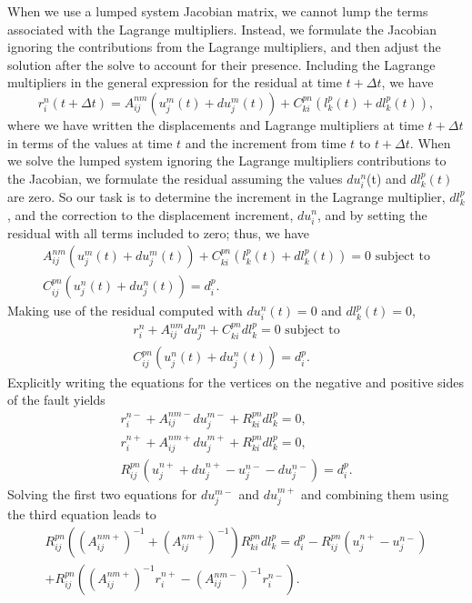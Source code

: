 When we use a lumped system Jacobian matrix, we cannot lump the terms
associated with the Lagrange multipliers. Instead, we formulate the
Jacobian ignoring the contributions from the Lagrange multipliers,
and then adjust the solution after the solve to account for their
presence. Including the Lagrange multipliers in the general expression
for the residual at time $t+\Delta t$, we have
\begin{equation}
r_{i}^{n}(t+\Delta t)=A_{ij}^{nm}(u_{j}^{m}(t)+du_{j}^{m}(t))+C_{ki}^{pn}(l_{k}^{p}(t)+dl_{k}^{p}(t)),
\end{equation}
where we have written the displacements and Lagrange multipliers at
time $t+\Delta t$ in terms of the values at time $t$ and the increment
from time $t$ to $t+\Delta t$. When we solve the lumped system ignoring
the Lagrange multipliers contributions to the Jacobian, we formulate
the residual assuming the values $du_{i}^{n}$(t) and $dl_{k}^{p}(t)$
are zero. So our task is to determine the increment in the Lagrange
multiplier, $dl_{k}^{p}$, and the correction to the displacement
increment, $du_{i}^{n}$, and by setting the residual with all terms
included to zero; thus, we have
\begin{gather}
A_{ij}^{nm}(u_{j}^{m}(t)+du_{j}^{m}(t))+C_{ki}^{pn}(l_{k}^{p}(t)+dl_{k}^{p}(t))=0\text{ subject to}\\
C_{ij}^{pn}(u_{j}^{n}(t)+du_{j}^{n}(t))=d_{i}^{p}.
\end{gather}
Making use of the residual computed with $du_{i}^{n}(t)=0$ and $dl_{k}^{p}(t)=0$,
\begin{gather}
r_{i}^{n}+A_{ij}^{nm}du_{j}^{m}+C_{ki}^{pn}dl_{k}^{p}=0\text{ subject to}\\
C_{ij}^{pn}(u_{j}^{n}(t)+du_{j}^{n}(t))=d_{i}^{p}.
\end{gather}
Explicitly writing the equations for the vertices on the negative
and positive sides of the fault yields
\begin{gather}
r_{i}^{n-}+A_{ij}^{nm-}du_{j}^{m-}+R_{ki}^{pn}dl_{k}^{p}=0,\\
r_{i}^{n+}+A_{ij}^{nm+}du_{j}^{m+}+R_{ki}^{pn}dl_{k}^{p}=0,\\
R_{ij}^{pn}(u_{j}^{n+}+du_{j}^{n+}-u_{j}^{n-}-du_{j}^{n-})=d_{i}^{p}.
\end{gather}
Solving the first two equations for $du_{j}^{m-}$ and $du_{j}^{m+}$
and combining them using the third equation leads to
\begin{multline}
R_{ij}^{pn}\left((A_{ij}^{nm+})^{-1}+(A_{ij}^{nm+})^{-1}\right)R_{ki}^{pn}dl_{k}^{p}=d_{i}^{p}-R_{ij}^{pn}(u_{j}^{n+}-u_{j}^{n-})\\
+R_{ij}^{pn}\left((A_{ij}^{nm+})^{-1}r_{i}^{n+}-(A_{ij}^{nm-})^{-1}r_{i}^{n-}\right).
\end{multline}
